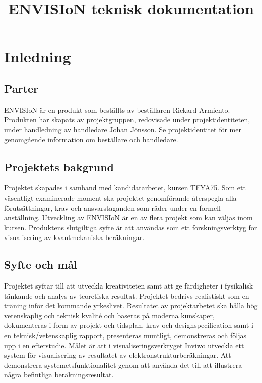 \documentclass[a4paper,12pt]{article}
\title{%
  ENVISIoN teknisk dokumentation%
  \label{envision-teknisk-dokumentation}}
\author{}
\date{}
\begin{document}
\LIPStitelsida
\newpage
{}
\begin{LIPSprojektidentitet}
\LIPSprojektroller
\end{LIPSprojektidentitet}
\newpage
\tableofcontents{}
\newpage
{}
\begin{LIPSdokumenthistorik}
\end{LIPSdokumenthistorik}
\newpage
{}

\section{Inledning}

\subsection{Parter}
ENVISIoN är en produkt som beställts av beställaren Rickard Armiento. Produkten har skapats av projektgruppen, redovisade under projektidentiteten, under handledning av handledare Johan Jönsson. Se projektidentitet för mer genomgående information om beställare och handledare.

\subsection{Projektets bakgrund} 
Projektet skapades i samband med kandidatarbetet, kursen TFYA75. Som ett väsentligt examinerade moment ska projektet genomförande återspegla alla förutsättningar, krav och ansvarstaganden som råder under en formell anställning. Utveckling av ENVISIoN är en av flera projekt som kan väljas inom kursen. Produktens slutgiltiga syfte är att användas som ett forskningsverktyg for visualisering av kvantmekaniska beräkningar.      

\subsection{Syfte och mål}
Projektet syftar till att utveckla kreativiteten samt att ge färdigheter i fysikalisk tänkande och analys av teoretiska resultat. Projektet bedrivs realistiskt som en träning inför det kommande yrkeslivet. Resultatet av projektarbetet ska hålla hög vetenskaplig och teknisk kvalité och baseras på moderna kunskaper, dokumenteras i form av projekt-och tidsplan, krav-och designspecification samt i en teknisk/vetenskaplig rapport, presenteras muntligt, demonstreras och följas upp i en efterstudie. Målet är att i visualiseringsverktyget Inviwo utveckla ett system för visualisering av resultatet av elektronstrukturberäkningar. Att demonstrera systemetsfunktionalitet genom att använda det till att illustrera några befintliga beräkningsresultat.
\end{document}
